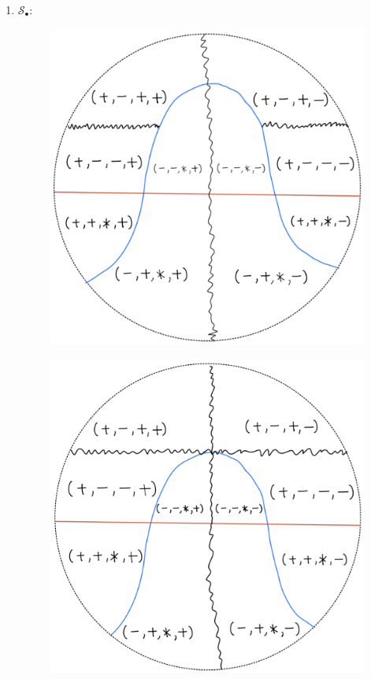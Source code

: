 \begin{definition}
\begin{enumerate}
\item $\mathcal{S}_\bullet$:
\begin{itemize}
\begin{figure}[H]
    \centering
    \includegraphics[scale = 0.45]{diagrams/cobord'2/7.png} 
    \caption{}
    \label{fig:your-label}
\end{figure}
\begin{figure}[H]
    \centering
    \includegraphics[scale = 0.45]{diagrams/cobord'2/8.png} 

\end{figure}
\end{itemize}
\end{enumerate}
\end{definition}
